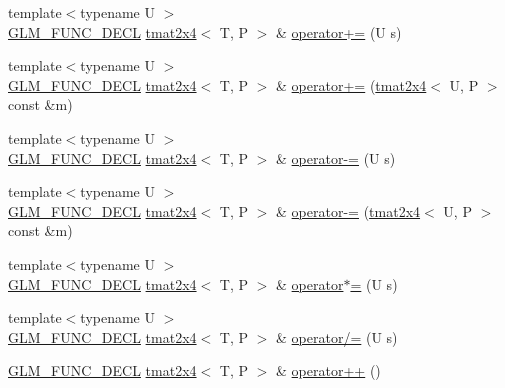 \begin{DoxyCompactItemize}
\item 
{\footnotesize template$<$typename U $>$ }\\\hyperlink{setup_8hpp_ab2d052de21a70539923e9bcbf6e83a51}{G\+L\+M\+\_\+\+F\+U\+N\+C\+\_\+\+D\+E\+CL} \hyperlink{structglm_1_1detail_1_1tmat2x4}{tmat2x4}$<$ T, P $>$ \& \hyperlink{structglm_1_1detail_1_1tmat2x4_a5bb3a875e7d771e04ef778dd65c69570}{operator+=} (U s)
\item 
{\footnotesize template$<$typename U $>$ }\\\hyperlink{setup_8hpp_ab2d052de21a70539923e9bcbf6e83a51}{G\+L\+M\+\_\+\+F\+U\+N\+C\+\_\+\+D\+E\+CL} \hyperlink{structglm_1_1detail_1_1tmat2x4}{tmat2x4}$<$ T, P $>$ \& \hyperlink{structglm_1_1detail_1_1tmat2x4_a298436a3ccd92e48b55bc4b8a39dd778}{operator+=} (\hyperlink{structglm_1_1detail_1_1tmat2x4}{tmat2x4}$<$ U, P $>$ const \&m)
\item 
{\footnotesize template$<$typename U $>$ }\\\hyperlink{setup_8hpp_ab2d052de21a70539923e9bcbf6e83a51}{G\+L\+M\+\_\+\+F\+U\+N\+C\+\_\+\+D\+E\+CL} \hyperlink{structglm_1_1detail_1_1tmat2x4}{tmat2x4}$<$ T, P $>$ \& \hyperlink{structglm_1_1detail_1_1tmat2x4_a35c469a505e64d85b1903cb8236bb40e}{operator-\/=} (U s)
\item 
{\footnotesize template$<$typename U $>$ }\\\hyperlink{setup_8hpp_ab2d052de21a70539923e9bcbf6e83a51}{G\+L\+M\+\_\+\+F\+U\+N\+C\+\_\+\+D\+E\+CL} \hyperlink{structglm_1_1detail_1_1tmat2x4}{tmat2x4}$<$ T, P $>$ \& \hyperlink{structglm_1_1detail_1_1tmat2x4_a4649ad6c38956df334d0b86042e207bd}{operator-\/=} (\hyperlink{structglm_1_1detail_1_1tmat2x4}{tmat2x4}$<$ U, P $>$ const \&m)
\item 
{\footnotesize template$<$typename U $>$ }\\\hyperlink{setup_8hpp_ab2d052de21a70539923e9bcbf6e83a51}{G\+L\+M\+\_\+\+F\+U\+N\+C\+\_\+\+D\+E\+CL} \hyperlink{structglm_1_1detail_1_1tmat2x4}{tmat2x4}$<$ T, P $>$ \& \hyperlink{structglm_1_1detail_1_1tmat2x4_af29fd96e82abe8f85ac318865d365755}{operator$\ast$=} (U s)
\item 
{\footnotesize template$<$typename U $>$ }\\\hyperlink{setup_8hpp_ab2d052de21a70539923e9bcbf6e83a51}{G\+L\+M\+\_\+\+F\+U\+N\+C\+\_\+\+D\+E\+CL} \hyperlink{structglm_1_1detail_1_1tmat2x4}{tmat2x4}$<$ T, P $>$ \& \hyperlink{structglm_1_1detail_1_1tmat2x4_a02241268cd53f9e9eee1a0e3deae6856}{operator/=} (U s)
\item 
\hyperlink{setup_8hpp_ab2d052de21a70539923e9bcbf6e83a51}{G\+L\+M\+\_\+\+F\+U\+N\+C\+\_\+\+D\+E\+CL} \hyperlink{structglm_1_1detail_1_1tmat2x4}{tmat2x4}$<$ T, P $>$ \& \hyperlink{structglm_1_1detail_1_1tmat2x4_ae3a31564490142cb6f43c1abb753b028}{operator++} ()

\end{DoxyCompactItemize}
